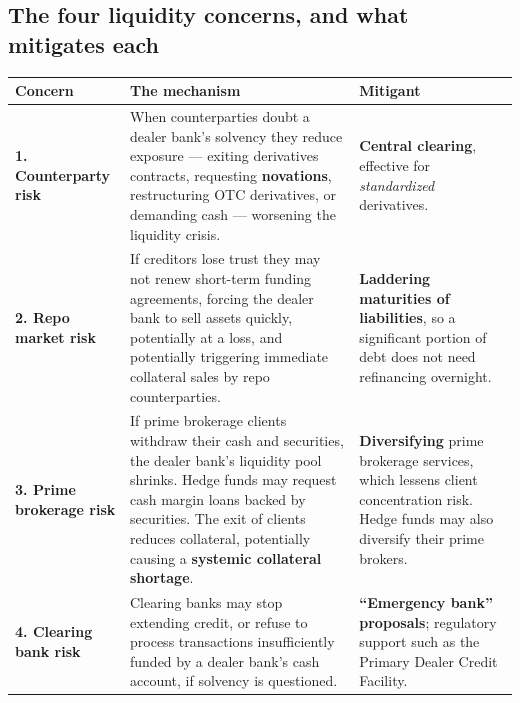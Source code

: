 
\subsection{The four liquidity concerns, and what mitigates each}

\begin{center}
\small
\begin{tabularx}{\textwidth}{@{}p{3.0cm} X p{4.0cm}@{}}
\toprule
\rowcolor{FRMSoft}\textbf{Concern} & \textbf{The mechanism} & \textbf{Mitigant} \\
\midrule
\textbf{1. Counterparty risk} &
When counterparties doubt a dealer bank's solvency they reduce exposure --- exiting derivatives contracts, requesting \textbf{novations}, restructuring OTC derivatives, or demanding cash --- worsening the liquidity crisis. &
\textbf{Central clearing}, effective for \emph{standardized} derivatives. \\
\addlinespace
\textbf{2. Repo market risk} &
If creditors lose trust they may not renew short-term funding agreements, forcing the dealer bank to sell assets quickly, potentially at a loss, and potentially triggering immediate collateral sales by repo counterparties. &
\textbf{Laddering maturities of liabilities}, so a significant portion of debt does not need refinancing overnight. \\
\addlinespace
\textbf{3. Prime brokerage risk} &
If prime brokerage clients withdraw their cash and securities, the dealer bank's liquidity pool shrinks. Hedge funds may request cash margin loans backed by securities. The exit of clients reduces collateral, potentially causing a \textbf{systemic collateral shortage}. &
\textbf{Diversifying} prime brokerage services, which lessens client concentration risk. Hedge funds may also diversify their prime brokers. \\
\addlinespace
\textbf{4. Clearing bank risk} &
Clearing banks may stop extending credit, or refuse to process transactions insufficiently funded by a dealer bank's cash account, if solvency is questioned. &
\textbf{``Emergency bank'' proposals}; regulatory support such as the Primary Dealer Credit Facility. \\
\bottomrule
\end{tabularx}
\end{center}

